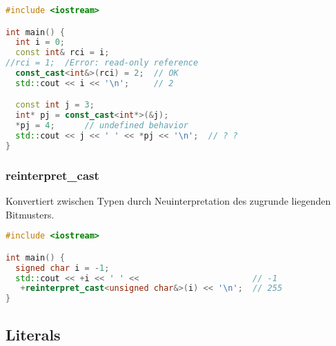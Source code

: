 \documentclass[10pt,twocolumn]{scrartcl}
\begin{document}
\begin{lstlisting}[language=C++]
#include <iostream>

int main() {
  int i = 0;
  const int& rci = i;
//rci = 1;  /Error: read-only reference
  const_cast<int&>(rci) = 2;  // OK
  std::cout << i << '\n';     // 2

  const int j = 3;
  int* pj = const_cast<int*>(&j);
  *pj = 4;      // undefined behavior
  std::cout << j << ' ' << *pj << '\n';  // ? ?
}
\end{lstlisting}

\subsubsection{reinterpret\_cast}

Konvertiert zwischen Typen durch Neuinterpretation des zugrunde liegenden
Bitmusters.

\begin{lstlisting}[language=C++]
#include <iostream>

int main() {
  signed char i = -1;
  std::cout << +i << ' ' <<                       // -1
   +reinterpret_cast<unsigned char&>(i) << '\n';  // 255
}
\end{lstlisting}

\subsection{Literals}
\end{document}
